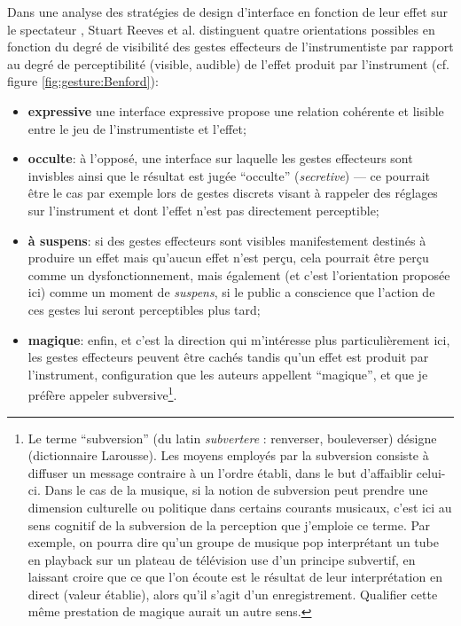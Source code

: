 \noindent Dans une analyse des stratégies de design d'interface en fonction de leur effet sur le spectateur \cite{reeves_designing_2005}, Stuart Reeves et al. distinguent quatre orientations possibles en fonction du degré de visibilité des gestes effecteurs de l'instrumentiste par rapport au degré de perceptibilité (visible, audible) de l'effet produit par l'instrument (cf. figure \ref{fig:gesture:Benford}):
\vspace{-1em}
\begin{itemize}[noitemsep]
 	\item \textbf{expressive} une interface expressive propose une relation cohérente et lisible entre le jeu de l'instrumentiste et l'effet; 
 	\item \textbf{occulte}: à l'opposé, une interface sur laquelle les gestes effecteurs sont invisbles ainsi que le résultat est jugée ``occulte'' (\textit{secretive}) — ce pourrait être le cas par exemple lors de gestes discrets visant à rappeler des réglages sur l'instrument et dont l'effet n'est pas directement perceptible; 
 	\item \textbf{à suspens}: si des gestes effecteurs sont visibles manifestement destinés à produire un effet mais qu'aucun effet n'est perçu, cela pourrait être perçu comme un dysfonctionnement, mais également (et c'est l'orientation proposée ici) comme un moment de \textit{suspens}, si le public a conscience que l'action de ces gestes lui seront perceptibles plus tard;
 	\item \textbf{magique}: enfin, et c'est la direction qui m'intéresse plus particulièrement ici, les gestes effecteurs peuvent être cachés tandis qu'un effet est produit par l'instrument, configuration que les auteurs appellent ``magique'', et que je préfère appeler subversive\footnote{Le terme ``subversion'' (du latin \textit{subvertere} : renverser, bouleverser) désigne  (dictionnaire Larousse). Les moyens employés par la subversion consiste à diffuser un message contraire à un l'ordre établi, dans le but d'affaiblir celui-ci. Dans le cas de la musique, si la notion de subversion peut prendre une dimension culturelle ou politique dans certains courants musicaux, c'est ici au sens cognitif de la subversion de la perception que j'emploie ce terme. Par exemple, on pourra dire qu'un groupe de musique pop interprétant un tube en playback sur un plateau de télévision use d'un principe subvertif, en laissant croire que ce que l'on écoute est le résultat de leur interprétation en direct (valeur établie), alors qu'il s'agit d'un enregistrement. Qualifier cette même prestation de magique aurait un autre sens.}.
\end{itemize}
